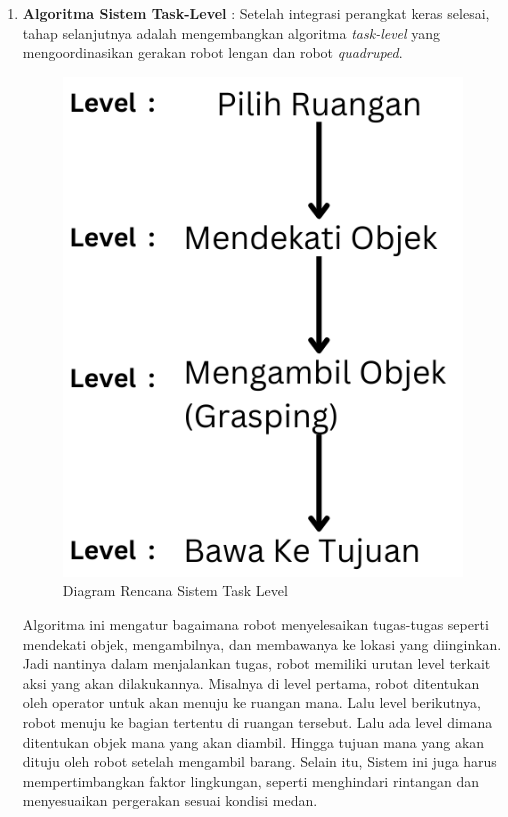 \begin{enumerate}
  \item \textbf{Algoritma Sistem Task-Level} : Setelah integrasi perangkat keras selesai, tahap selanjutnya adalah
  mengembangkan algoritma \emph{task-level} yang mengoordinasikan gerakan robot lengan dan robot \emph{quadruped}.
  \begin{figure} [H] \centering
    \includegraphics[scale=0.5]{gambar/Diagram Task Level.png}
    \caption{Diagram Rencana Sistem Task Level}
    \label{fig:diagram_task_level}
  \end{figure}
  Algoritma ini mengatur bagaimana robot menyelesaikan tugas-tugas seperti mendekati objek, mengambilnya, dan
  membawanya ke lokasi yang diinginkan. Jadi nantinya dalam menjalankan tugas, robot memiliki urutan level terkait aksi yang akan dilakukannya.
  Misalnya di level pertama, robot ditentukan oleh operator untuk akan menuju ke ruangan mana. 
  Lalu level berikutnya, robot menuju ke bagian tertentu di ruangan tersebut. Lalu ada level dimana ditentukan objek mana yang akan diambil.
  Hingga tujuan mana yang akan dituju oleh robot setelah mengambil barang. Selain itu,
   Sistem ini juga harus mempertimbangkan faktor lingkungan, seperti menghindari
  rintangan dan menyesuaikan pergerakan sesuai kondisi medan.


\end{enumerate}
